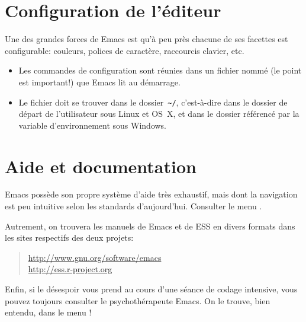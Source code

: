 \section{Configuration de l'éditeur}
\label{emacs+ess:configuration}

Une des grandes forces de Emacs est qu'à peu près chacune de ses
facettes est configurable: couleurs, polices de caractère, raccourcis
clavier, etc.

\begin{itemize}
\item Les commandes de configuration sont réunies dans un fichier nommé
   (le point est important!) que Emacs lit au démarrage.
\item Le fichier  doit se trouver dans le dossier
  \,\verb=~/=, c'est-à-dire dans le dossier de départ de l'utilisateur
  sous Linux et OS~X, et dans le dossier référencé par la variable
  d'environnement  sous Windows.
\end{itemize}


\section{Aide et documentation}
\label{emacs+ess:aide}

Emacs possède son propre système d'aide très exhaustif, mais dont la
navigation est peu intuitive selon les standards d'aujourd'hui.
Consulter le menu .

Autrement, on trouvera les manuels de Emacs et de ESS en divers
formats dans les sites respectifs des deux projets:
\begin{quote}
  \url{http://www.gnu.org/software/emacs} \\
  \url{http://ess.r-project.org}
\end{quote}

Enfin, si le désespoir vous prend au cours d'une séance de codage
intensive, vous pouvez toujours consulter le psychothérapeute Emacs.
On le trouve, bien entendu, dans le menu !

